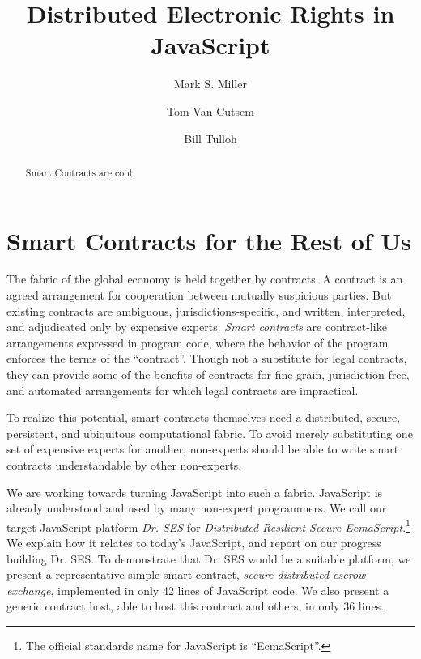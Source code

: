 \documentclass{llncs}
\begin{document}
\sloppypar


\title{Distributed Electronic Rights in JavaScript}

\author{Mark S. Miller \and Tom Van Cutsem \and Bill Tulloh }


\maketitle    

\begin{abstract}

Smart Contracts are cool. 

\end{abstract}


\section{Smart Contracts for the Rest of Us}

The fabric of the global economy is held together by contracts. A contract is an agreed arrangement for cooperation between mutually suspicious parties. But existing contracts are ambiguous, jurisdictions-specific, and written, interpreted, and adjudicated only by expensive experts. \emph{Smart contracts} are contract-like arrangements expressed in program code, where the behavior of the program enforces the terms of the ``contract''\cite{szabo1997formalizing}. Though not a substitute for legal contracts, they can provide some of the benefits of contracts for fine-grain, jurisdiction-free, and automated arrangements for which legal contracts are impractical.

To realize this potential, smart contracts themselves need a distributed, secure, persistent, and ubiquitous computational fabric. To avoid merely substituting one set of expensive experts for another, non-experts should be able to write smart contracts understandable by other non-experts.

We are working towards turning JavaScript into such a fabric. JavaScript is already understood and used by many non-expert programmers. We call our target JavaScript platform \emph{Dr. SES} for \emph{Distributed Resilient Secure EcmaScript}.\footnote{
%
The official standards name for JavaScript is ``EcmaScript''.
%
} We explain how it relates to today's JavaScript, and report on our progress building Dr. SES. To demonstrate that Dr. SES would be a suitable platform, we present a representative simple smart contract, \emph{secure distributed escrow exchange}, implemented in only 42 lines of JavaScript code. We also present a generic contract host, able to host this contract and others, in only 36 lines.
\end{document}

